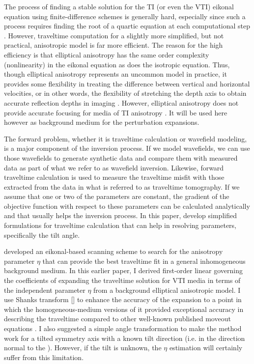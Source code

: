 The process of finding a stable solution for
the TI (or even the VTI) eikonal equation using finite-difference schemes is
generally hard, especially since such a process requires finding the root of a quartic
equation at each computational step \cite[]{wang:T129}. However, traveltime computation for a 
slightly more simplified, but not practical,  anisotropic model is far more efficient. The reason for the high efficiency
is that elliptical anisotropy has the
same order  complexity (nonlinearity) in the eikonal equation as does the isotropic equation. Thus, though elliptical
anisotropy represents an uncommon model in practice, 
it provides some flexibility in treating the difference between
vertical and horizontal velocities, or in other words, the flexibility of stretching the depth axis
to obtain accurate reflection depths in imaging
\cite[]{TLE20-05-05240527,GEO60-05-14951513,ohlsen:1600}. 
However, elliptical anisotropy does not provide accurate focusing
for media of  TI anisotropy \cite[]{GEO59-09-14051418}.
 It will be used here however as 
  background medium \geosout{)} for the perturbation
 expansions.

The forward problem, whether it is traveltime calculation or wavefield modeling,  is a major component of the inversion process. If we model wavefields,
we can use those wavefields to generate synthetic data and compare them with measured data as part of what we refer to as wavefield inversion.
Likewise, forward traveltime calculation is used to measure the traveltime misfit with those extracted from the data in what is referred to as
traveltime tomography. If we assume that one or two of the parameters are constant, the gradient of the objective function with respect to these parameters
can be calculated analytically and that usually
helps the inversion process. In this paper,   develop simplified formulations for traveltime calculation that can help in resolving
  parameters, specifically the tilt angle.

 \cite{etascan} developed an eikonal-based scanning scheme to search
 for the anisotropy parameter $\eta$ that can provide the best
 traveltime fit  in a general inhomogeneous background medium. In this earlier paper, I derived first-order
 linear  governing the coefficients of expanding the traveltime
 solution for VTI media in terms of the independent parameter $\eta$
 from a background elliptical anisotropic model. I use  Shanks transform [\cite{Bender}] to enhance the accuracy of the expansion to a point in
 which the homogeneous-medium versions of it provided exceptional accuracy in describing the traveltime compared to other well-known published
 moveout equations \cite[]{GEO65-04-13161325}. 
I also suggested a simple angle transformation to make the method work for a tilted symmetry axis with a known tilt
 direction (i.e. in the direction normal to the ). However, if the tilt  is unknown, the $\eta$ estimation will certainly suffer from this limitation.

